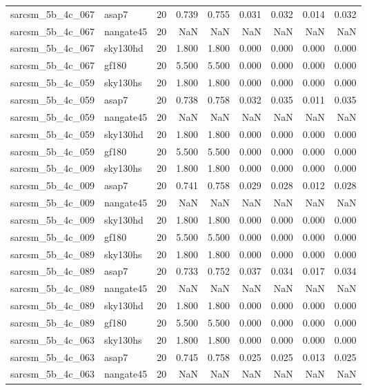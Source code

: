 \begin{tabular}{llrrrrrrr}
sarcsm\_5b\_4c\_067 & asap7 & 20 & 0.739 & 0.755 & 0.031 & 0.032 & 0.014 & 0.032 \\
sarcsm\_5b\_4c\_067 & nangate45 & 20 & NaN & NaN & NaN & NaN & NaN & NaN \\
sarcsm\_5b\_4c\_067 & sky130hd & 20 & 1.800 & 1.800 & 0.000 & 0.000 & 0.000 & 0.000 \\
sarcsm\_5b\_4c\_067 & gf180 & 20 & 5.500 & 5.500 & 0.000 & 0.000 & 0.000 & 0.000 \\
sarcsm\_5b\_4c\_059 & sky130hs & 20 & 1.800 & 1.800 & 0.000 & 0.000 & 0.000 & 0.000 \\
sarcsm\_5b\_4c\_059 & asap7 & 20 & 0.738 & 0.758 & 0.032 & 0.035 & 0.011 & 0.035 \\
sarcsm\_5b\_4c\_059 & nangate45 & 20 & NaN & NaN & NaN & NaN & NaN & NaN \\
sarcsm\_5b\_4c\_059 & sky130hd & 20 & 1.800 & 1.800 & 0.000 & 0.000 & 0.000 & 0.000 \\
sarcsm\_5b\_4c\_059 & gf180 & 20 & 5.500 & 5.500 & 0.000 & 0.000 & 0.000 & 0.000 \\
sarcsm\_5b\_4c\_009 & sky130hs & 20 & 1.800 & 1.800 & 0.000 & 0.000 & 0.000 & 0.000 \\
sarcsm\_5b\_4c\_009 & asap7 & 20 & 0.741 & 0.758 & 0.029 & 0.028 & 0.012 & 0.028 \\
sarcsm\_5b\_4c\_009 & nangate45 & 20 & NaN & NaN & NaN & NaN & NaN & NaN \\
sarcsm\_5b\_4c\_009 & sky130hd & 20 & 1.800 & 1.800 & 0.000 & 0.000 & 0.000 & 0.000 \\
sarcsm\_5b\_4c\_009 & gf180 & 20 & 5.500 & 5.500 & 0.000 & 0.000 & 0.000 & 0.000 \\
sarcsm\_5b\_4c\_089 & sky130hs & 20 & 1.800 & 1.800 & 0.000 & 0.000 & 0.000 & 0.000 \\
sarcsm\_5b\_4c\_089 & asap7 & 20 & 0.733 & 0.752 & 0.037 & 0.034 & 0.017 & 0.034 \\
sarcsm\_5b\_4c\_089 & nangate45 & 20 & NaN & NaN & NaN & NaN & NaN & NaN \\
sarcsm\_5b\_4c\_089 & sky130hd & 20 & 1.800 & 1.800 & 0.000 & 0.000 & 0.000 & 0.000 \\
sarcsm\_5b\_4c\_089 & gf180 & 20 & 5.500 & 5.500 & 0.000 & 0.000 & 0.000 & 0.000 \\
sarcsm\_5b\_4c\_063 & sky130hs & 20 & 1.800 & 1.800 & 0.000 & 0.000 & 0.000 & 0.000 \\
sarcsm\_5b\_4c\_063 & asap7 & 20 & 0.745 & 0.758 & 0.025 & 0.025 & 0.013 & 0.025 \\
sarcsm\_5b\_4c\_063 & nangate45 & 20 & NaN & NaN & NaN & NaN & NaN & NaN \\

\end{tabular}

